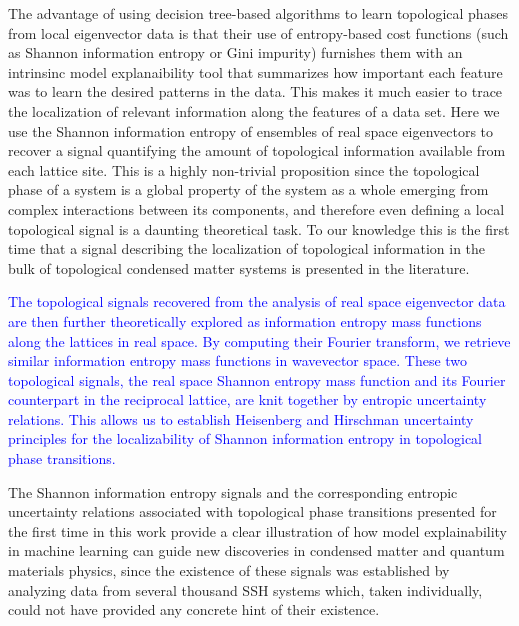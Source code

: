\documentclass[10pt]{revtex4-1}
\newcommand{\citequote}[1]{\ref{#1}}
\begin{document}
The advantage of using decision tree-based algorithms to learn topological phases from local eigenvector data is that their use of entropy-based cost functions (such as Shannon information entropy or Gini impurity) furnishes them with an intrinsinc model explanaibility tool that summarizes how important each feature was to learn the desired patterns in the data. This makes it much easier to trace the localization of relevant information along the features of a data set. Here we use the Shannon information entropy of ensembles of real space eigenvectors to recover a signal quantifying the amount of topological information available from each lattice site. This is a highly non-trivial proposition since the topological phase of a system is a global property of the system as a whole emerging from complex interactions between its components, and therefore even defining a local topological signal is a daunting theoretical task. To our knowledge this is the first time that a signal describing the localization of topological information in the bulk of topological condensed matter systems is presented in the literature.

\textcolor{blue}{The topological signals recovered from the analysis of real space eigenvector data are then further theoretically explored as information entropy mass functions along the lattices in real space. By computing their Fourier transform, we retrieve similar information entropy mass functions in wavevector space. These two topological signals, the real space Shannon entropy mass function and its Fourier counterpart in  the reciprocal lattice, are knit together by entropic uncertainty relations. This allows us to establish Heisenberg and Hirschman uncertainty principles for the localizability of Shannon information entropy in topological phase transitions.}  %

The Shannon information entropy signals and the corresponding entropic uncertainty relations associated with topological phase transitions presented for the first time in this work provide a clear illustration of how model explainability in machine learning can guide new discoveries in condensed matter and quantum materials physics, since the existence of these signals was established by analyzing data from several thousand SSH systems which, taken individually, could not have provided any concrete hint of their existence.%
\end{document}
